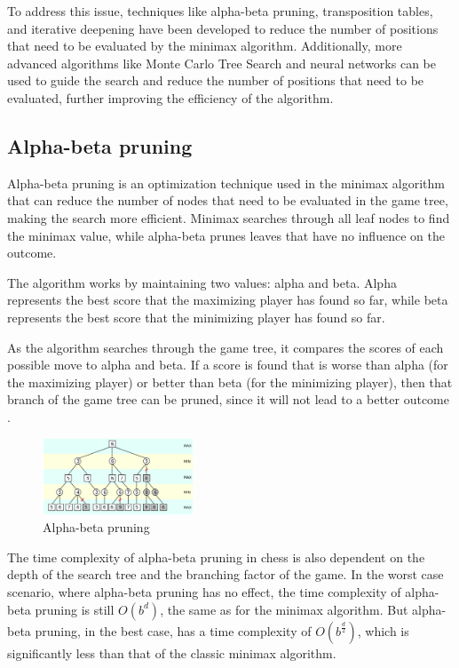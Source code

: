 To address this issue, techniques like alpha-beta pruning, transposition tables, and iterative deepening have been developed to reduce the number of positions that need to be evaluated by the minimax algorithm. Additionally, more advanced algorithms like Monte Carlo Tree Search and neural networks can be used to guide the search and reduce the number of positions that need to be evaluated, further improving the efficiency of the algorithm.

\subsection{Alpha-beta pruning}
\label{subsec:ch2sec2subsec2}

Alpha-beta pruning is an optimization technique used in the minimax algorithm that can reduce the number of nodes that need to be evaluated in the game tree, making the search more efficient. Minimax searches through all leaf nodes to find the minimax value, while alpha-beta prunes leaves that have no influence on the outcome.

The algorithm works by maintaining two values: alpha and beta. Alpha represents the best score that the maximizing player has found so far, while beta represents the best score that the minimizing player has found so far.

As the algorithm searches through the game tree, it compares the scores of each possible move to alpha and beta. If a score is found that is worse than alpha (for the maximizing player) or better than beta (for the minimizing player), then that branch of the game tree can be pruned, since it will not lead to a better outcome \cite{carolus2006alpha}.

\begin{figure}[h]
    \centering
    \includegraphics[width=0.4\textwidth]{figures/alpha-beta-pruning.png}
    \caption{Alpha-beta pruning}
    \label{fig:alphaBetaPruning}
\end{figure}

The time complexity of alpha-beta pruning in chess is also dependent on the depth of the search tree and the branching factor of the game. In the worst case scenario, where alpha-beta pruning has no effect, the time complexity of alpha-beta pruning is still $O(b^{d})$, the same as for the minimax algorithm. But alpha-beta pruning, in the best case, has a time complexity of $O(b^{\frac{d}{2}})$, which is significantly less than that of the classic minimax algorithm.

